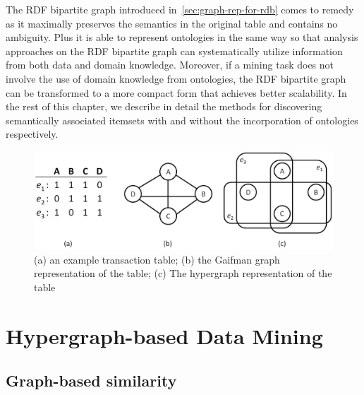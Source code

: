 The RDF bipartite graph introduced in~\ref{sec:graph-rep-for-rdb} comes to remedy as it maximally preserves the semantics in the original table and contains no ambiguity. Plus it is able to represent ontologies in the same way so that analysis approaches on the RDF bipartite graph can systematically utilize information from both data and domain knowledge. Moreover, if a mining task does not involve the use of domain knowledge from ontologies, the RDF bipartite graph can be transformed to a more compact form that achieves better scalability. In the rest of this chapter, we describe in detail the methods for discovering semantically associated itemsets with and without the incorporation of ontologies respectively.

\begin{figure}[tbh]
\begin{center}
\includegraphics[width=.8\textwidth]{fig/hg_and_rg1.eps}
\end{center}
\caption{\label{fig:hg_and_rg} (a) an example transaction table; (b) the Gaifman graph representation of the table; (c) The hypergraph representation of the table}
\end{figure}

\section{Hypergraph-based Data Mining}
\subsection{Graph-based similarity}

